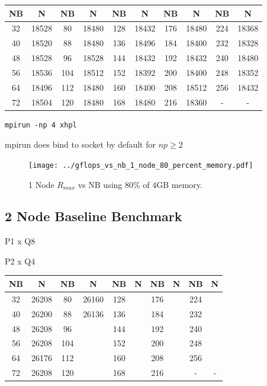 \documentclass{article}
\begin{document}
\begin{center}
	\begin{tabular}{ |c|c|c|c|c|c|c|c|c|c| } 
		\hline
		NB & N & NB & N & NB & N & NB & N & NB & N \\ 
		\hline
		32 & 18528 &  80 & 18480 & 128 & 18432 & 176 & 18480 & 224 & 18368 \\ 
		40 & 18520 &  88 & 18480 & 136 & 18496 & 184 & 18400 & 232 & 18328 \\ 
 		48 & 18528 &  96 & 18528 & 144 & 18432 & 192 & 18432 & 240 & 18480 \\
		56 & 18536 & 104 & 18512 & 152 & 18392 & 200 & 18400 & 248 & 18352 \\ 
 		64 & 18496 & 112 & 18480 & 160 & 18400 & 208 & 18512 & 256 & 18432 \\
		72 & 18504 & 120 & 18480 & 168 & 18480 & 216 & 18360 &   - &     - \\ 
 		\hline
	\end{tabular}
\end{center}

\begin{lstlisting}[frame=single]
mpirun -np 4 xhpl
\end{lstlisting}

mpirun does bind to socket by default for $np \geq 2$

\begin{figure}
	\centering	
	\texttt{[image: ../gflops\_vs\_nb\_1\_node\_80\_percent\_memory.pdf]}
	\caption{1 Node $R_{max}$ vs NB using 80\% of 4GB memory.}
\end{figure}



\subsection{2 Node Baseline Benchmark}

P1 x Q8

P2 x Q4

\begin{center}
	\begin{tabular}{ |c|c|c|c|c|c|c|c|c|c| } 
		\hline
		NB & N & NB & N & NB & N & NB & N & NB & N \\ 
		\hline
		32 & 26208 &  80 & 26160 & 128 &  & 176 &  & 224 &  \\ 
		40 & 26200 &  88 & 26136 & 136 &  & 184 &  & 232 &  \\ 
 		48 & 26208 &  96 &  & 144 &  & 192 &  & 240 &  \\
		56 & 26208 & 104 &  & 152 &  & 200 &  & 248 &  \\ 
 		64 & 26176 & 112 &  & 160 &  & 208 &  & 256 &  \\
		72 & 26208 & 120 &  & 168 &  & 216 &  &   - &    - \\ 
 		\hline
	\end{tabular}
\end{center}
\end{document}
